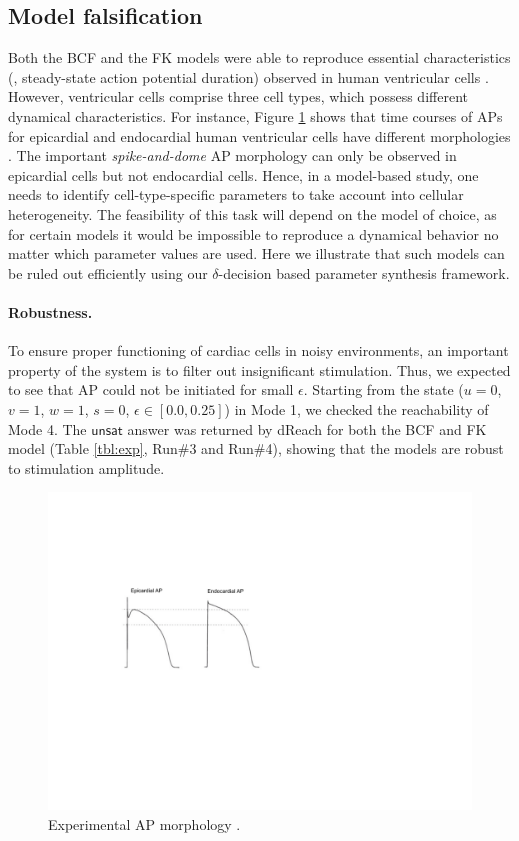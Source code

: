 \subsection{Model falsification}
Both the BCF and the FK models were able to reproduce essential characteristics (\eg, steady-state action potential duration) observed in human ventricular cells \cite{fenton98,orovio08}. However, ventricular cells comprise three cell types, which possess different dynamical characteristics. For instance, Figure \ref{ap} shows that time courses of APs for epicardial and endocardial human ventricular cells have different morphologies \cite{nabauer96}. The important \textit{spike-and-dome} AP morphology can only be observed in epicardial cells but not endocardial cells. Hence, in a model-based study, one needs to identify cell-type-specific parameters to take account into cellular heterogeneity. The feasibility of this task will depend on the model of choice, as for certain models it would be impossible to reproduce a dynamical behavior no matter which parameter values are used. Here we illustrate that such models can be ruled out efficiently using our $\delta$-decision based parameter synthesis framework.

\paragraph{Robustness.}
To ensure proper functioning of cardiac cells in noisy environments, an important property of the system is to filter out insignificant stimulation. Thus, we expected to see that AP could not be initiated for small $\epsilon$. Starting from the state ($u = 0$, $v = 1$, $w = 1$, $s = 0$, $\epsilon \in [0.0,0.25]$) in Mode 1, we checked the reachability of Mode 4. The $\mathsf{unsat}$ answer was returned by dReach for both the BCF and FK
model (Table \ref{tbl:exp}, Run\#3 and Run\#4), showing that the models are robust to stimulation amplitude.

\begin{figure}[th]
\centering
\includegraphics[scale=0.8]{fig-ap}
\caption{Experimental AP morphology \cite{nabauer96}.}
\label{ap}
\end{figure}

